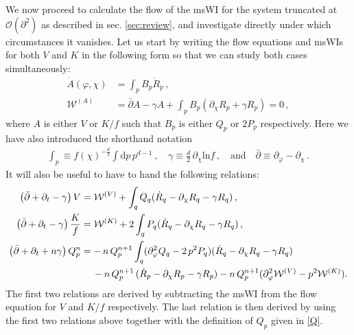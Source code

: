 \documentclass[11pt]{book} %
\numberwithin{equation}{chapter}
\begin{document}
We now proceed to calculate the flow of the msWI for the system truncated
at $\mathcal{O}(\partial^2)$ as described in sec. \ref{sec:review},
and investigate directly under which circumstances it vanishes.
Let us start by writing the flow equations and msWIs for both $V$ and $K$ in the following form
so that we can study both cases simultaneously:
\begin{align}
	\label{flowA}
	\dot A(\varphi,\chi) &= \int_p B_p\dot R_p \,,\\
	\label{msWIA}
	\mathcal{W}^{(A)}&=\bar\partial A - \gamma A + \int_p B_p(\partial_\chi R_p + \gamma R_p)=0 \,,
\end{align}
where $A$ is either $V$ or $K/f$ such that $B_p$ is either $Q_p$ or $2 P_p$ respectively.
Here we have also introduced the shorthand notation
\begin{align}
  \label{gamma}
  \int_p \equiv f(\chi)^{-\frac{d}{2}} \int \mathrm dp \,p^{d-1} \,,
  \quad \gamma \equiv \frac{d}{2} \, \partial_\chi \mathrm{ln} f \,,
  \quad \text{and} \quad \bar\partial \equiv \partial_\varphi - \partial_\chi\,.
\end{align}
It will also be useful to have to hand the following relations:
\begin{align}
	\label{DV}
	\left( \bar \partial + \partial_t - \gamma \right) V &=
	\mathcal W^{(V)} + \int_q Q_q (\dot R_q - \partial_{\chi} R_q - \gamma R_q)\,,\\
	\label{DK}
	\left( \bar \partial + \partial_t - \gamma \right) \frac{K}{f} &=
	\mathcal W^{(K)} + 2 \int_q P_q (\dot R_q - \partial_{\chi} R_q - \gamma R_q)\,,\\
	\label{DQ}
	\left( \bar \partial + \partial_t + n \gamma \right) Q_p^n &=
	- \, n \, Q_p^{n+1} \int_q (\partial_{\varphi}^2 Q_q - 2 \, p^2 P_q)(\dot R_q - \partial_{\chi} R_q
	 - \gamma R_q)\nonumber\\
   &\hspace{4.2mm}-n \, Q_p^{n+1} \, (\dot R_p - \partial_{\chi} R_p - \gamma R_p)
	-n \, Q_p^{n+1} (\partial_{\varphi}^2 \mathcal W^{(V)} - p^2 \mathcal W^{(K)}).
\end{align}
The first two relations are derived by subtracting the msWI from the flow equation for
$V$ and $K/f$ respectively. The last relation is then derived by using the first two relations
above together with the definition of $Q_p$ given in \eqref{Q}.
\end{document}
